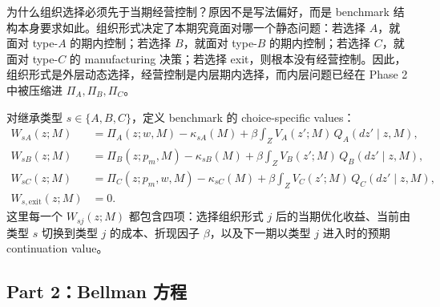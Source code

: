 为什么组织选择必须先于当期经营控制？原因不是写法偏好，而是 benchmark 结构本身要求如此。组织形式决定了本期究竟面对哪一个静态问题：若选择 $A$，就面对 type-$A$ 的期内控制；若选择 $B$，就面对 type-$B$ 的期内控制；若选择 $C$，就面对 type-$C$ 的 manufacturing 决策；若选择 exit，则根本没有经营控制。因此，组织形式是外层动态选择，经营控制是内层期内选择，而内层问题已经在 Phase 2 中被压缩进 $\Pi_A,\Pi_B,\Pi_C$。

对继承类型 $s\in\{A,B,C\}$，定义 benchmark 的 choice-specific values：
\begin{align*}
W_{sA}(z;M)
&=
\Pi_A(z;w,M)-\kappa_{sA}(M)
+\beta\int_Z V_A(z';M)\,Q_A(dz'\mid z,M),\\
W_{sB}(z;M)
&=
\Pi_B(z;p_m,M)-\kappa_{sB}(M)
+\beta\int_Z V_B(z';M)\,Q_B(dz'\mid z,M),\\
W_{sC}(z;M)
&=
\Pi_C(z;p_m,w,M)-\kappa_{sC}(M)
+\beta\int_Z V_C(z';M)\,Q_C(dz'\mid z,M),\\
W_{s,\mathrm{exit}}(z;M)
&=0.
\end{align*}
这里每一个 $W_{sj}(z;M)$ 都包含四项：选择组织形式 $j$ 后的当期优化收益、当前由类型 $s$ 切换到类型 $j$ 的成本、折现因子 $\beta$，以及下一期以类型 $j$ 进入时的预期 continuation value。

\subsection{Part 2：Bellman 方程}

